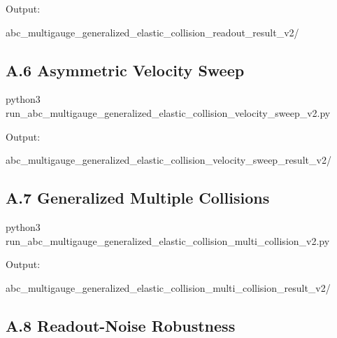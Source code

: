 \documentclass[
  a4paper,
]{article}
\newenvironment{Shaded}{}{}
\newcommand{\NormalTok}[1]{#1}
\begin{document}
Output:

\begin{Shaded}
\begin{Highlighting}[]
\NormalTok{abc\_multigauge\_generalized\_elastic\_collision\_readout\_result\_v2/}
\end{Highlighting}
\end{Shaded}

\subsection{A.6 Asymmetric Velocity
Sweep}\label{a.6-asymmetric-velocity-sweep}

\begin{Shaded}
\begin{Highlighting}[]
\NormalTok{python3 run\_abc\_multigauge\_generalized\_elastic\_collision\_velocity\_sweep\_v2.py}
\end{Highlighting}
\end{Shaded}

Output:

\begin{Shaded}
\begin{Highlighting}[]
\NormalTok{abc\_multigauge\_generalized\_elastic\_collision\_velocity\_sweep\_result\_v2/}
\end{Highlighting}
\end{Shaded}

\subsection{A.7 Generalized Multiple
Collisions}\label{a.7-generalized-multiple-collisions}

\begin{Shaded}
\begin{Highlighting}[]
\NormalTok{python3 run\_abc\_multigauge\_generalized\_elastic\_collision\_multi\_collision\_v2.py}
\end{Highlighting}
\end{Shaded}

Output:

\begin{Shaded}
\begin{Highlighting}[]
\NormalTok{abc\_multigauge\_generalized\_elastic\_collision\_multi\_collision\_result\_v2/}
\end{Highlighting}
\end{Shaded}

\subsection{A.8 Readout-Noise
Robustness}\label{a.8-readout-noise-robustness}
\end{document}
